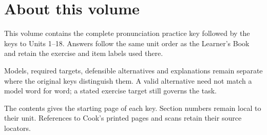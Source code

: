 \section*{About this volume}
This volume contains the complete pronunciation practice key followed by the keys to Units 1–18. Answers follow the same unit order as the Learner’s Book and retain the exercise and item labels used there.\par
Models, required targets, defensible alternatives and explanations remain separate where the original keys distinguish them. A valid alternative need not match a model word for word; a stated exercise target still governs the task.\par
The contents gives the starting page of each key. Section numbers remain local to their unit. References to Cook’s printed pages and scans retain their source locators.\par
\clearpage\renewcommand{\runningtitle}{Contents}
\setcounter{tocdepth}{2}
\tableofcontents
\BookRecto{}




















